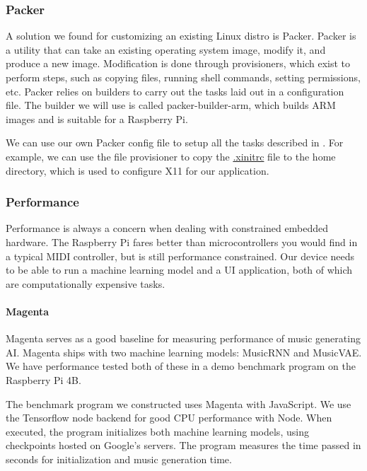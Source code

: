 \subsubsection{Packer}

A solution we found for customizing an existing Linux distro is Packer. Packer is a
utility that can take an existing operating system image, modify it, and produce a new
image. Modification is done through provisioners, which exist to perform steps, such as
copying files, running shell commands, setting permissions, etc. Packer relies on builders
to carry out the tasks laid out in a configuration file. The builder we will use is called
packer-builder-arm, which builds ARM images and is suitable for a Raspberry Pi.

We can use our own Packer config file to setup all the tasks described in
. For example, we can use the file provisioner to
copy the \url{.xinitrc} file to the home directory, which is used to configure X11 for our
application.

\subsubsection{Performance}

Performance is always a concern when dealing with constrained embedded hardware. The
Raspberry Pi fares better than microcontrollers you would find in a typical MIDI
controller, but is still performance constrained. Our device needs to be able to run a
machine learning model and a UI application, both of which are computationally expensive
tasks.

\paragraph{Magenta}

Magenta serves as a good baseline for measuring performance of music generating AI.
Magenta ships with two machine learning models: MusicRNN and MusicVAE. We have performance
tested both of these in a demo benchmark program on the Raspberry Pi 4B.

The benchmark program we constructed uses Magenta with JavaScript. We use the Tensorflow
node backend for good CPU performance with Node. When executed, the program initializes
both machine learning models, using checkpoints hosted on Google's servers. The program
measures the time passed in seconds for initialization and music generation time.

